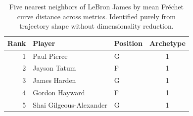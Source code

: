 \begin{table}[htbp]
  \centering\small
  \begin{tabular}{rllc}
    \toprule
    Rank & Player & Position & Archetype \\
    \midrule
    1 & Paul Pierce & G & 1 \\
    2 & Jayson Tatum & F & 1 \\
    3 & James Harden & G & 1 \\
    4 & Gordon Hayward & F & 1 \\
    5 & Shai Gilgeous-Alexander & G & 1 \\
    \bottomrule
  \end{tabular}
  \caption{Five nearest neighbors of LeBron James by mean Fr\'{e}chet curve distance across metrics. Identified purely from trajectory shape without dimensionality reduction.}
  \label{tab:LeBron_James_frechet_curve_neighbors}
\end{table}

